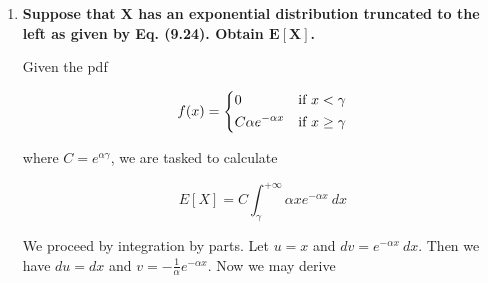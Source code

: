 \documentclass[10pt, oneside]{article}
\begin{document}
\begin{enumerate}[label=9.\arabic*]
\begin{align*}
&= \frac{K}{\sqrt{2\pi}} \bigg( \int^{\frac{1}{2} ( \frac{\tau-\mu}{\sigma} )^2}_{+\infty} \sigma \exp(-z) \ dz + \sqrt{2\pi} \mu \Phi \bigg( \frac{\tau-\mu}{\sigma} \bigg) \bigg) \\
&= \frac{K}{\sqrt{2\pi}} \bigg( -\sigma \exp(-z) \bigg|^{\frac{1}{2} ( \frac{\tau-\mu}{\sigma} )^2}_{+\infty} + \sqrt{2\pi} \mu \Phi \bigg( \frac{\tau-\mu}{\sigma} \bigg) \bigg) \\
&= \frac{K}{\sqrt{2\pi}} \bigg[ \sqrt{2\pi} \mu \Phi \bigg( \frac{\tau-\mu}{\sigma} \bigg) - \sigma \exp \bigg( -\frac{1}{2} \bigg( \frac{\tau-\mu}{\sigma} \bigg)^2 \bigg) \bigg] \\
&= \boxed{ \mu - \frac{\sigma}{\sqrt{2\pi}} \frac{1}{\Phi [(\tau-\mu)/\sigma]} \exp \bigg( -\frac{1}{2} \bigg( \frac{\tau-\mu}{\sigma} \bigg)^2 \bigg) }
\end{align*}

Which has the intuitive explanation of simply being the mean $\mu$ with a correction term; since each of the constituent parts of the correction term are positive, it follows that the correction term itself is positive. As we are truncating the distribution to the right, the minus sign ahead of the correction term aligns with our intuition that the expectation must shift leftward.

\item  \begin{tcolorbox}[
  colback=Cerulean!5!white,
  colframe=Cerulean!75!black]
\textbf{Suppose that $\bm{X}$ has an exponential distribution truncated to the left as given by Eq. (9.24). Obtain $\bm{E[X]}$.}
\end{tcolorbox}

Given the pdf

\[
f(x) = \begin{dcases}
0 & \text{if } x < \gamma \\
C\alpha e^{-\alpha x} & \text{if } x \geq \gamma
\end{dcases}
\]

where $C = e^{\alpha \gamma}$, we are tasked to calculate

\[ E[X] = C \int^{+\infty}_\gamma \alpha x e^{-\alpha x} \ dx \]

We proceed by integration by parts. Let $u = x$ and $dv = e^{-\alpha x} \ dx$. Then we have $du = dx$ and $v = -\frac{1}{\alpha} e^{-\alpha x}$. Now we may derive


\end{enumerate}
\end{document}
